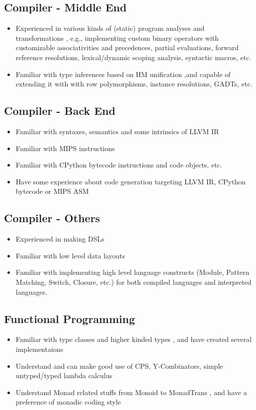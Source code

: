 \documentclass{resume}
\begin{document}
\subsection{\textbf{Compiler - Middle End}}
\begin{itemize}
  \item Experienced in various kinds of (static) program analyses and transformations
        , e.g.,
          implementing custom binary operators with customizable associativities and precedences,
          partial evaluations, forward reference resolutions, lexical/dynamic scoping analysis, syntactic macros, etc.
  \item Familiar with type inferences based on HM unification
      ,and capable of extending it with
       with row polymorphisms, instance resolutions, GADTs, etc.
\end{itemize}

\subsection{\textbf{Compiler - Back End}}
\begin{itemize}
  \item Familiar with syntaxes, semantics and some intrinsics of LLVM IR
  \item Familiar with MIPS instructions
  \item Familiar with CPython bytecode instructions and code objects, etc.
  \item Have some experience about code generation targeting LLVM IR, CPython bytecode or MIPS ASM
\end{itemize}

\subsection{\textbf{Compiler - Others}}
\begin{itemize}
  \item Experienced in making DSLs
  \item Familiar with low level data layouts
  \item Familiar with implementing high level language constructs
        (Module, Pattern Matching, Switch, Closure, etc.) for both
        compiled languages and interpreted languages.
\end{itemize}

\subsection{\textbf{Functional Programming}}
\begin{itemize}
  \item Familiar with type classes and higher kinded types
        , and have created several implementaions
  \item Understand and can make good use of CPS, Y-Combinators, simple untyped/typed lambda calculus
  \item Understand Monad related stuffs from Monoid to MonadTrans
        , and have a preference of monadic coding style
\end{itemize}
\end{document}
